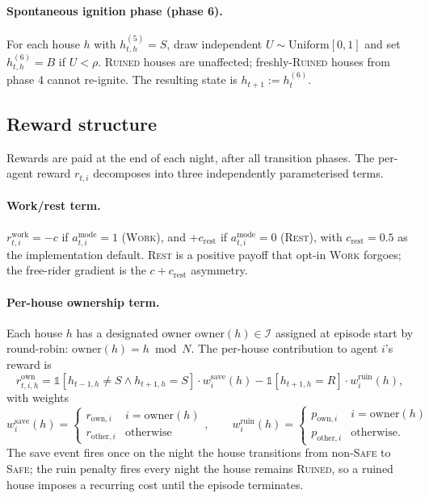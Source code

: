 \documentclass{anvil-paper}
\begin{document}
\paragraph{Spontaneous ignition phase (phase 6).}
For each house $h$ with $h_{t,h}^{(5)}=S$, draw independent
$U\sim\mathrm{Uniform}[0,1]$ and set $h_{t,h}^{(6)}=B$ if $U<\rho$.
\textsc{Ruined} houses are unaffected; freshly-\textsc{Ruined} houses
from phase 4 cannot re-ignite. The resulting state is
$h_{t+1}:=h_t^{(6)}$.

\subsection{Reward structure}
\label{app:envspec:reward}

Rewards are paid at the end of each night, after all transition phases.
The per-agent reward $r_{t,i}$ decomposes into three independently
parameterised terms.

\paragraph{Work/rest term.}
$r_{t,i}^{\text{work}}=-c$ if $a_{t,i}^{\text{mode}}=1$
(\textsc{Work}), and $+c_{\text{rest}}$ if $a_{t,i}^{\text{mode}}=0$
(\textsc{Rest}), with $c_{\text{rest}}=0.5$ as the implementation
default. \textsc{Rest} is a positive payoff that opt-in \textsc{Work}
forgoes; the free-rider gradient is the $c+c_{\text{rest}}$ asymmetry.

\paragraph{Per-house ownership term.}
Each house $h$ has a designated owner $\mathrm{owner}(h)\in\mathcal{I}$
assigned at episode start by round-robin: $\mathrm{owner}(h)=h\bmod N$.
The per-house contribution to agent $i$'s reward is
\[
  r_{t,i,h}^{\text{own}} = \mathbb{1}[h_{t-1,h}\neq S\land h_{t+1,h}=S]
                           \cdot w^{\text{save}}_i(h)
                         - \mathbb{1}[h_{t+1,h}=R]\cdot w^{\text{ruin}}_i(h),
\]
with weights
\[
  w^{\text{save}}_i(h) = \begin{cases}
    r_{\text{own},i} & i=\mathrm{owner}(h) \\
    r_{\text{other},i} & \text{otherwise}
  \end{cases},\qquad
  w^{\text{ruin}}_i(h) = \begin{cases}
    p_{\text{own},i} & i=\mathrm{owner}(h) \\
    p_{\text{other},i} & \text{otherwise.}
  \end{cases}
\]
The save event fires once on the night the house transitions from
non-\textsc{Safe} to \textsc{Safe}; the ruin penalty fires every night
the house remains \textsc{Ruined}, so a ruined house imposes a recurring
cost until the episode terminates.
\end{document}
